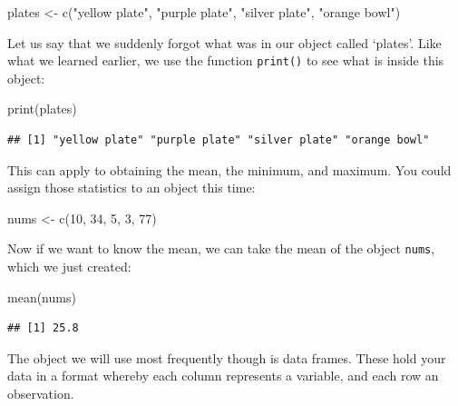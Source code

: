 \documentclass[
]{book}
\newenvironment{Shaded}{\begin{snugshade}}{\end{snugshade}}
\newcommand{\DecValTok}[1]{\textcolor[rgb]{0.00,0.00,0.81}{#1}}
\newcommand{\FunctionTok}[1]{\textcolor[rgb]{0.00,0.00,0.00}{#1}}
\newcommand{\NormalTok}[1]{#1}
\newcommand{\OtherTok}[1]{\textcolor[rgb]{0.56,0.35,0.01}{#1}}
\newcommand{\StringTok}[1]{\textcolor[rgb]{0.31,0.60,0.02}{#1}}
\begin{document}
\begin{Shaded}
\begin{Highlighting}[]
\NormalTok{plates }\OtherTok{\textless{}{-}} \FunctionTok{c}\NormalTok{(}\StringTok{"yellow plate"}\NormalTok{, }\StringTok{"purple plate"}\NormalTok{, }\StringTok{"silver plate"}\NormalTok{, }\StringTok{"orange bowl"}\NormalTok{)}
\end{Highlighting}
\end{Shaded}

Let us say that we suddenly forgot what was in our object called `plates'. Like what we learned earlier, we use the function \texttt{print()} to see what is inside this object:

\begin{Shaded}
\begin{Highlighting}[]
\FunctionTok{print}\NormalTok{(plates)}
\end{Highlighting}
\end{Shaded}

\begin{verbatim}
## [1] "yellow plate" "purple plate" "silver plate" "orange bowl"
\end{verbatim}

This can apply to obtaining the mean, the minimum, and maximum. You could assign those statistics to an object this time:

\begin{Shaded}
\begin{Highlighting}[]
\NormalTok{nums }\OtherTok{\textless{}{-}} \FunctionTok{c}\NormalTok{(}\DecValTok{10}\NormalTok{, }\DecValTok{34}\NormalTok{, }\DecValTok{5}\NormalTok{, }\DecValTok{3}\NormalTok{, }\DecValTok{77}\NormalTok{)}
\end{Highlighting}
\end{Shaded}

Now if we want to know the mean, we can take the mean of the object \texttt{nums}, which we just created:

\begin{Shaded}
\begin{Highlighting}[]
\FunctionTok{mean}\NormalTok{(nums)}
\end{Highlighting}
\end{Shaded}

\begin{verbatim}
## [1] 25.8
\end{verbatim}

The object we will use most frequently though is data frames. These hold your data in a format whereby each column represents a variable, and each row an observation.
\end{document}

